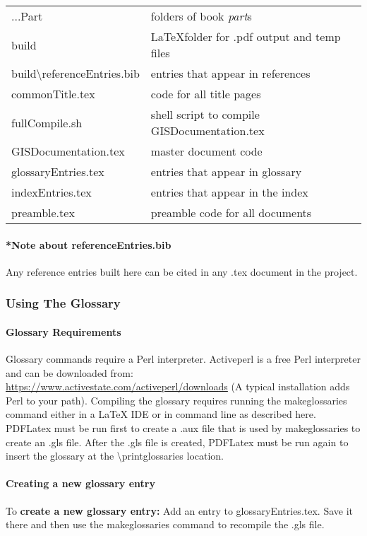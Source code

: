 \begin{adjmulticols}{1}{\innerMar}{\outerMar}
\begin{tabular}{p{6cm}| p{9cm} }
...Part & folders of book \textit{part}s\\
build & \LaTeX{}folder for .pdf output and temp files \\
build\textbackslash referenceEntries.bib & entries that appear in references\\
commonTitle.tex & code for all title pages\\
fullCompile.sh & shell script to compile GISDocumentation.tex\\
GISDocumentation.tex & master document code\\
glossaryEntries.tex & entries that appear in glossary\\
indexEntries.tex & entries that appear in the index\\
preamble.tex & preamble code for all documents\\
\end{tabular}
\end{adjmulticols}
\paragraph*{*Note about referenceEntries.bib}
{\footnotesize Any reference entries built here can be cited in any .tex document in the project.}

\clearpage

\subsubsection[Using The Glossary]{{\Large Using The Glossary}}
\paragraph{Glossary Requirements}
Glossary commands require a Perl interpreter.  Activeperl is a free Perl interpreter and can be downloaded from:\\ \href{https://www.activestate.com/activeperl/downloads}{https://www.activestate.com/activeperl/downloads}
{\tiny (A typical installation adds Perl to your path)}.  Compiling the glossary requires running the makeglossaries command either in a \LaTeX{} IDE or in command line as described here.  PDFLatex must be run first to create a .aux file that is used by makeglossaries to create an .gls file.  After the .gls file is created, PDFLatex must be run again to insert the glossary at the \textbackslash printglossaries location.
\paragraph{Creating a new glossary entry}
To \textbf{create a new glossary entry:} Add an entry to glossaryEntries.tex.  Save it there and then use the makeglossaries command to recompile the .gls file.
